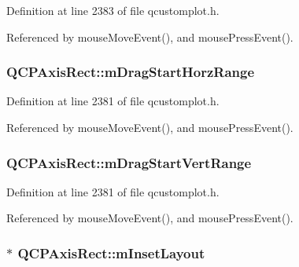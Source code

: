 Definition at line 2383 of file qcustomplot.\+h.



Referenced by mouse\+Move\+Event(), and mouse\+Press\+Event().

\hypertarget{class_q_c_p_axis_rect_a41936cf473ec638bec382f5a40cdb1f3}{}
\subsubsection[{m\+Drag\+Start\+Horz\+Range}]{ Q\+C\+P\+Axis\+Rect\+::m\+Drag\+Start\+Horz\+Range\hspace{0.3cm}{\ttfamily [protected]}}\label{class_q_c_p_axis_rect_a41936cf473ec638bec382f5a40cdb1f3}


Definition at line 2381 of file qcustomplot.\+h.



Referenced by mouse\+Move\+Event(), and mouse\+Press\+Event().

\hypertarget{class_q_c_p_axis_rect_a1a5ae4c74b8bd46baf91bf4e4f4165f0}{}
\subsubsection[{m\+Drag\+Start\+Vert\+Range}]{ Q\+C\+P\+Axis\+Rect\+::m\+Drag\+Start\+Vert\+Range\hspace{0.3cm}{\ttfamily [protected]}}\label{class_q_c_p_axis_rect_a1a5ae4c74b8bd46baf91bf4e4f4165f0}


Definition at line 2381 of file qcustomplot.\+h.



Referenced by mouse\+Move\+Event(), and mouse\+Press\+Event().

\hypertarget{class_q_c_p_axis_rect_a255240399e0fd24baad80cbbe46f698a}{}
\subsubsection[{m\+Inset\+Layout}]{$\ast$ Q\+C\+P\+Axis\+Rect\+::m\+Inset\+Layout\hspace{0.3cm}{\ttfamily [protected]}}\label{class_q_c_p_axis_rect_a255240399e0fd24baad80cbbe46f698a}


